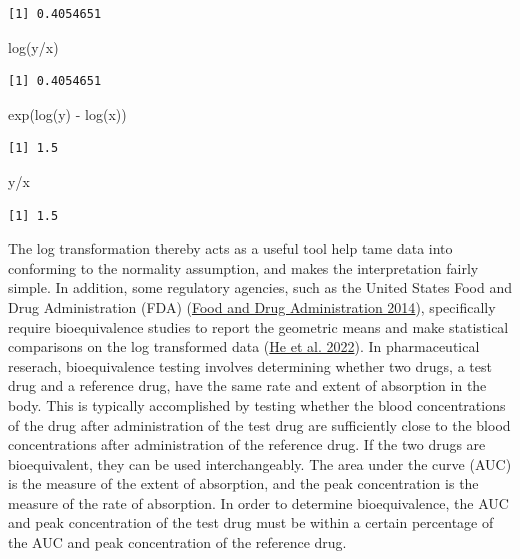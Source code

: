 \documentclass[
]{interact}
\newenvironment{Shaded}{\begin{snugshade}}{\end{snugshade}}
\newcommand{\FunctionTok}[1]{\textcolor[rgb]{0.28,0.35,0.67}{#1}}
\newcommand{\NormalTok}[1]{\textcolor[rgb]{0.00,0.23,0.31}{#1}}
\newcommand{\SpecialCharTok}[1]{\textcolor[rgb]{0.37,0.37,0.37}{#1}}
\begin{document}
\begin{verbatim}
[1] 0.4054651
\end{verbatim}

\begin{Shaded}
\begin{Highlighting}[]
\FunctionTok{log}\NormalTok{(y}\SpecialCharTok{/}\NormalTok{x)}
\end{Highlighting}
\end{Shaded}

\begin{verbatim}
[1] 0.4054651
\end{verbatim}

\begin{Shaded}
\begin{Highlighting}[]
\FunctionTok{exp}\NormalTok{(}\FunctionTok{log}\NormalTok{(y) }\SpecialCharTok{{-}} \FunctionTok{log}\NormalTok{(x))}
\end{Highlighting}
\end{Shaded}

\begin{verbatim}
[1] 1.5
\end{verbatim}

\begin{Shaded}
\begin{Highlighting}[]
\NormalTok{y}\SpecialCharTok{/}\NormalTok{x}
\end{Highlighting}
\end{Shaded}

\begin{verbatim}
[1] 1.5
\end{verbatim}

The log transformation thereby acts as a useful tool help tame data into
conforming to the normality assumption, and makes the interpretation
fairly simple. In addition, some regulatory agencies, such as the United
States Food and Drug Administration (FDA)
(\protect\hyperlink{ref-fda}{Food and Drug Administration 2014}),
specifically require bioequivalence studies to report the geometric
means and make statistical comparisons on the log transformed data
(\protect\hyperlink{ref-he2022}{He et al. 2022}). In pharmaceutical
reserach, bioequivalence testing involves determining whether two drugs,
a test drug and a reference drug, have the same rate and extent of
absorption in the body. This is typically accomplished by testing
whether the blood concentrations of the drug after administration of the
test drug are sufficiently close to the blood concentrations after
administration of the reference drug. If the two drugs are
bioequivalent, they can be used interchangeably. The area under the
curve (AUC) is the measure of the extent of absorption, and the peak
concentration is the measure of the rate of absorption. In order to
determine bioequivalence, the AUC and peak concentration of the test
drug must be within a certain percentage of the AUC and peak
concentration of the reference drug.
\end{document}
